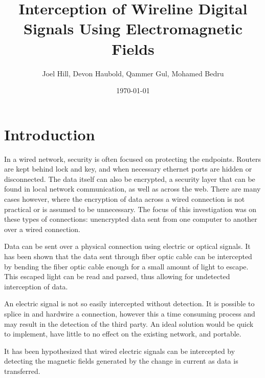 \documentclass{article}
\begin{document}
\author{Joel Hill, Devon Haubold, Qammer Gul, Mohamed Bedru}
\title{Interception of Wireline Digital Signals Using Electromagnetic Fields}
\date{\today{}}
\maketitle{} %

\newpage{}
\tableofcontents{}
\newpage
{}
\section{Introduction}
In a wired network, security is often focused on protecting the endpoints. Routers are kept behind lock and key, and when necessary ethernet ports are hidden or disconnected. The data itself can also be encrypted, a security layer that can be found in local network communication, as well as across the web. There are many cases however, where the encryption of data across a wired connection is not practical or is assumed to be unnecessary. The focus of this investigation was on these types of connections: unencrypted data sent from one computer to another over a wired connection.


Data can be sent over a physical connection using electric or optical signals. It has been shown that the data sent through fiber optic cable can be intercepted by bending the fiber optic cable enough for a small amount of light to escape. This escaped light can be read and parsed, thus allowing for undetected interception of data. 


An electric signal is not so easily intercepted without detection. It is possible to splice in and hardwire a connection, however this a time consuming process and may result in the detection of the third party. An ideal solution would be quick to implement, have little to no effect on the existing network, and portable. 


It has been hypothesized that wired electric signals can be intercepted by detecting the magnetic fields generated by the change in current as data is transferred.
\end{document}
